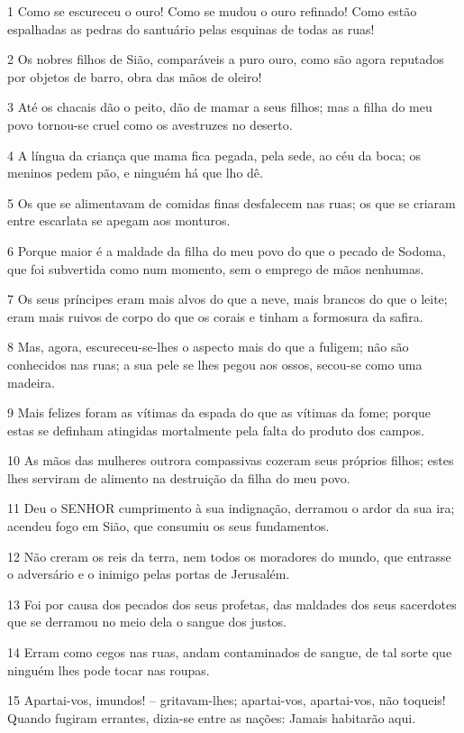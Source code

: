 \par 1 Como se escureceu o ouro! Como se mudou o ouro refinado! Como estão espalhadas as pedras do santuário pelas esquinas de todas as ruas!
\par 2 Os nobres filhos de Sião, comparáveis a puro ouro, como são agora reputados por objetos de barro, obra das mãos de oleiro!
\par 3 Até os chacais dão o peito, dão de mamar a seus filhos; mas a filha do meu povo tornou-se cruel como os avestruzes no deserto.
\par 4 A língua da criança que mama fica pegada, pela sede, ao céu da boca; os meninos pedem pão, e ninguém há que lho dê.
\par 5 Os que se alimentavam de comidas finas desfalecem nas ruas; os que se criaram entre escarlata se apegam aos monturos.
\par 6 Porque maior é a maldade da filha do meu povo do que o pecado de Sodoma, que foi subvertida como num momento, sem o emprego de mãos nenhumas.
\par 7 Os seus príncipes eram mais alvos do que a neve, mais brancos do que o leite; eram mais ruivos de corpo do que os corais e tinham a formosura da safira.
\par 8 Mas, agora, escureceu-se-lhes o aspecto mais do que a fuligem; não são conhecidos nas ruas; a sua pele se lhes pegou aos ossos, secou-se como uma madeira.
\par 9 Mais felizes foram as vítimas da espada do que as vítimas da fome; porque estas se definham atingidas mortalmente pela falta do produto dos campos.
\par 10 As mãos das mulheres outrora compassivas cozeram seus próprios filhos; estes lhes serviram de alimento na destruição da filha do meu povo.
\par 11 Deu o SENHOR cumprimento à sua indignação, derramou o ardor da sua ira; acendeu fogo em Sião, que consumiu os seus fundamentos.
\par 12 Não creram os reis da terra, nem todos os moradores do mundo, que entrasse o adversário e o inimigo pelas portas de Jerusalém.
\par 13 Foi por causa dos pecados dos seus profetas, das maldades dos seus sacerdotes que se derramou no meio dela o sangue dos justos.
\par 14 Erram como cegos nas ruas, andam contaminados de sangue, de tal sorte que ninguém lhes pode tocar nas roupas.
\par 15 Apartai-vos, imundos! -- gritavam-lhes; apartai-vos, apartai-vos, não toqueis! Quando fugiram errantes, dizia-se entre as nações: Jamais habitarão aqui.
